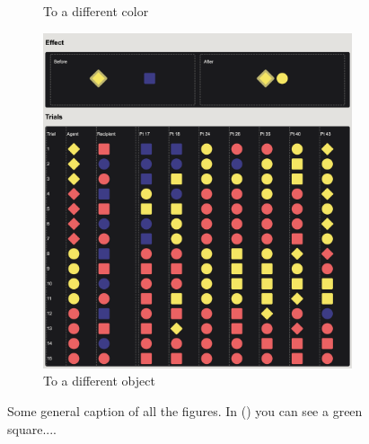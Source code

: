 \documentclass{article}
\begin{document}
\begin{figure}[b]
\begin{subfigure}[t]{0.31\textwidth}
  	\caption{To a different color} \label{fig:group04}
  \end{subfigure}
  \hfill
  \begin{subfigure}[t]{0.31\textwidth}
  	\centering
  	\includegraphics[width=\linewidth]{group05} 
  	\caption{To a different object} \label{fig:group05}
  \end{subfigure}
  \caption{Some general caption of all the figures. In () you can see a  green square....}
\end{figure}
\end{document}
